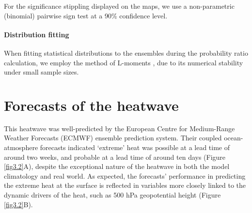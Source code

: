       For the significance stippling displayed on the maps, we use a non-parametric (binomial) pairwise sign test at a 90\% confidence level.

    \paragraph{Distribution fitting}

      When fitting statistical distributions to the ensembles during the probability ratio calculation, we employ the method of L-moments \citep{hosking_l-moments_1990}, due to its numerical stability under small sample sizes.

  \section{Forecasts of the heatwave}\label{ch3:forecasts}

    This heatwave was well-predicted by the European Centre for Medium-Range Weather Forecasts (ECMWF) ensemble prediction system. Their coupled ocean-atmosphere forecasts indicated `extreme' heat was possible at a lead time of around two weeks, and probable at a lead time of around ten days (Figure \ref{fig3.2}A), despite the exceptional nature of the heatwave in both the model climatology and real world. As expected, the forecasts' performance in predicting the extreme heat at the surface is reflected in variables more closely linked to the dynamic drivers of the heat, such as 500 hPa geopotential height (Figure \ref{fig3.2}B). 
    
